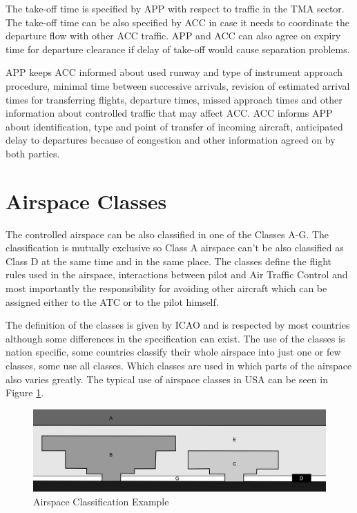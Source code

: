 The take-off time is specified by APP with respect to traffic in the TMA sector. The take-off time can be also specified by ACC in case it needs to coordinate the departure flow with other ACC traffic. APP and ACC can also agree on expiry time for departure clearance if delay of take-off would cause separation problems.

APP keeps ACC informed about used runway and type of instrument approach procedure, minimal time between successive arrivals, revision of estimated arrival times for transferring flights, departure times, missed approach times and other information about controlled traffic that may affect ACC. ACC informs APP about identification, type and point of transfer of incoming aircraft, anticipated delay to departures because of congestion and other information agreed on by both parties.\cite[Chapter 10]{doc4444}

\section{Airspace Classes}

The controlled airspace can be also classified in one of the Classes A-G. The classification is mutually exclusive so Class A airspace can't be also classified as Class D at the same time and in the same place. The classes define the flight rules used in the airspace, interactions between pilot and Air Traffic Control and most importantly the responsibility for avoiding other aircraft which can be assigned either to the ATC or to the pilot himself. \cite{annex11}

The definition of the classes is given by ICAO and is respected by most countries although some differences in the specification can exist. The use of the classes is nation specific, some countries classify their whole airspace into just one or few classes, some use all classes. Which classes are used in which parts of the airspace also varies greatly. \cite{classes} The typical use of airspace classes in USA can be seen in Figure \ref{fig:classes}.

\begin{figure}[h]
    \centering
    \includegraphics[width=\textwidth]{figures/classes.png}
    \caption{Airspace Classification Example \cite{nolan}}
    \label{fig:classes}
\end{figure}


